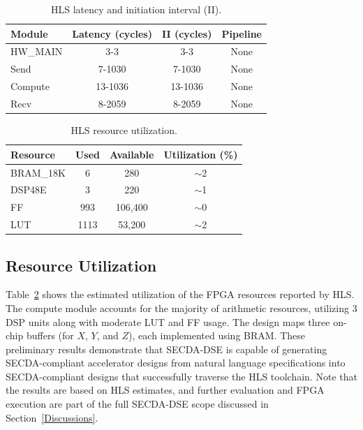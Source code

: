 \begin{table}[t]
  \centering
  \caption{HLS latency and initiation interval (II).}
  \label{tab:vecmul-latency}
  \begin{tabular}{lccc}
    \hline
    Module & Latency (cycles) & II (cycles) & Pipeline \\
    \hline
    HW\_MAIN & 3-3 & 3-3 & None \\
    Send     & 7-1030 & 7-1030 & None \\
    Compute  & 13-1036 & 13-1036 & None \\
    Recv     & 8-2059 & 8-2059 & None \\
    \hline
  \end{tabular}
\end{table}




\begin{table}[t]
  \centering
  \caption{HLS resource utilization.}
  \label{tab:vecmul-resources}
  \begin{tabular}{lccc}
    \hline
    Resource & Used & Available & Utilization (\%) \\
    \hline
    BRAM\_18K & 6 & 280 & $\sim$2 \\
    DSP48E    & 3 & 220 & $\sim$1 \\
    FF        & 993 & 106{,}400 & $\sim$0 \\
    LUT       & 1113 & 53{,}200 & $\sim$2 \\
    \hline
  \end{tabular}
\end{table}


\subsection{Resource Utilization}

Table~\ref{tab:vecmul-resources} shows the estimated utilization of the FPGA resources reported by HLS. The compute module accounts for the majority of arithmetic resources, utilizing 3 DSP units along with moderate LUT and FF usage. 
The design maps three on-chip buffers (for $X$, $Y$, and $Z$), each implemented using BRAM. 
These preliminary results demonstrate that SECDA-DSE is capable of generating SECDA-compliant accelerator designs from natural language specifications into SECDA-compliant designs that successfully traverse the HLS toolchain. 
Note that the results are based on HLS estimates, and further evaluation and FPGA execution are part of the full SECDA-DSE scope discussed in Section~\ref{Discussions}.


